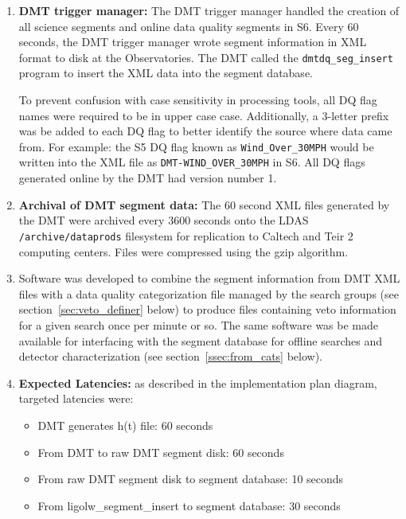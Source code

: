 \begin{enumerate}
\item \textbf{DMT trigger manager:} The DMT trigger manager handled
the creation of all science segments and online data quality segments
in S6. Every 60 seconds, the DMT trigger manager wrote segment
information in XML format to disk at the Observatories. The DMT called
the \texttt{dmtdq\_seg\_insert} program to insert the XML data into
the segment database.

To prevent confusion with case sensitivity in processing tools, all
DQ flag names were required to be in upper case case. Additionally, a
3-letter prefix was be added to each DQ flag to better identify the
source where data came from. For example: the S5 DQ flag known as
\texttt{Wind\_Over\_30MPH} would be written into the XML file as
\texttt{DMT-WIND\_OVER\_30MPH} in S6. All DQ flags generated online by
the DMT had version number 1.

\item \textbf{Archival of DMT segment data:} The 60 second XML files
generated by the DMT were archived every 3600 seconds onto the LDAS
\verb|/archive/dataprods| filesystem for replication to Caltech and
Teir 2 computing centers. Files were compressed using the gzip
algorithm.

\item Software was developed to combine the segment
information from DMT XML files with a data quality categorization file
managed by the search groups (see section~\ref{sec:veto_definer}
below) to produce files containing veto information for a given search
once per minute or so.  The same software was be made available for
interfacing with the segment database for offline searches and
detector characterization (see section~\ref{ssec:from_cats}
below).

\item \textbf{Expected Latencies:} as described in the implementation plan
diagram, targeted latencies were:
\begin{itemize}
\item DMT generates h(t) file: 60 seconds
\item From DMT to raw DMT segment disk: 60 seconds
\item From raw DMT segment disk to segment database: 10 seconds
\item From ligolw\_segment\_insert to segment database: 30 seconds
\end{itemize}
\end{enumerate}



